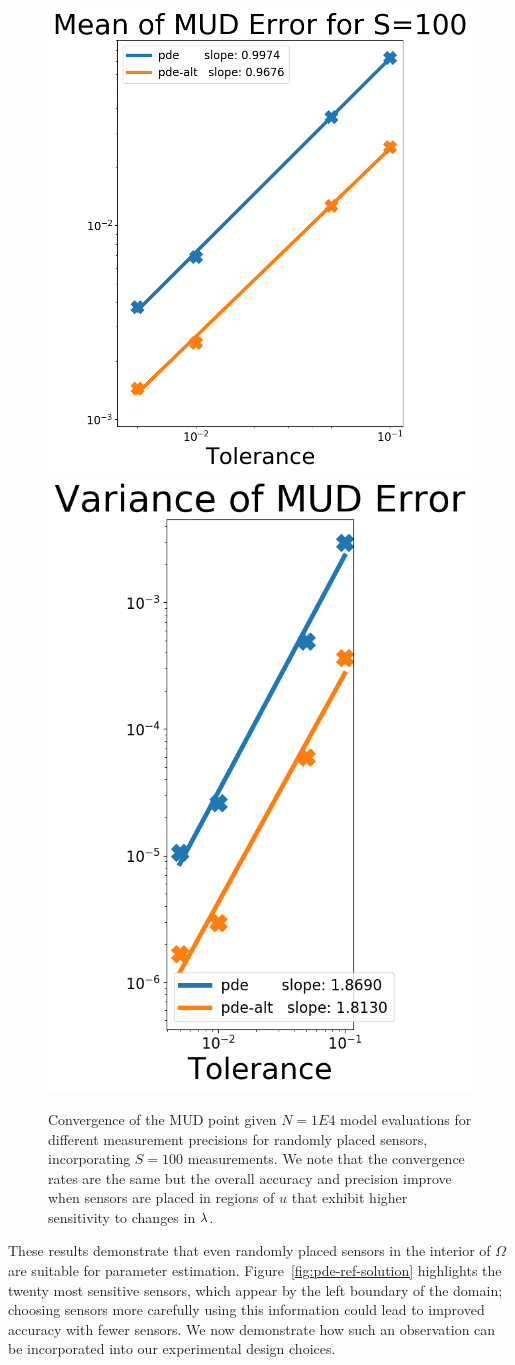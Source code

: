 \begin{figure}[htbp]
  \centering
  \includegraphics[width=0.475\linewidth]{figures/pde/pde_convergence_mud_std_mean}
  \includegraphics[width=0.475\linewidth]{figures/pde/pde_convergence_mud_std_var}
  \caption{Convergence of the MUD point given $N=1E4$ model evaluations for different measurement precisions for randomly placed sensors, incorporating $S=100$ measurements.
  We note that the convergence rates are the same but the overall accuracy and precision improve when sensors are placed in regions of $u$ that exhibit higher sensitivity to changes in $\lambda$.
  }
  \label{fig:pde-convergence-std}
\end{figure}


These results demonstrate that even randomly placed sensors in the interior of $\Omega$ are suitable for parameter estimation.
Figure~\ref{fig:pde-ref-solution} highlights the twenty most sensitive sensors, which appear by the left boundary of the domain; choosing sensors more carefully using this information could lead to improved accuracy with fewer sensors.
We now demonstrate how such an observation can be incorporated into our experimental design choices.


